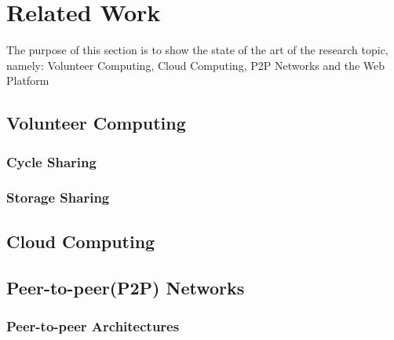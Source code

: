 % 
% 

\section{Related Work}
The purpose of this section is to show the state of the art of the research topic, namely: Volunteer Computing, Cloud Computing, P2P Networks and the Web Platform



  \subsection{Volunteer Computing}


    \subsubsection{Cycle Sharing}

    \subsubsection{Storage Sharing}


  \subsection{Cloud Computing}



  \subsection{Peer-to-peer(P2P) Networks}

    \subsubsection{Peer-to-peer Architectures}





